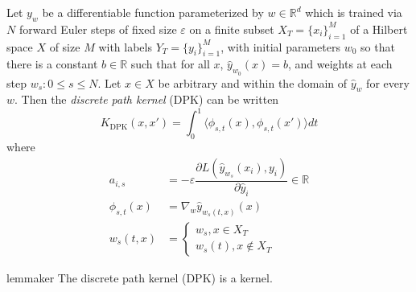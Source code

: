 \begin{definition}
Let $ y_{w}$ be a differentiable function parameterized by $w \in \mathbb{R}^d$ which is trained via $N$ forward Euler steps of fixed size $\varepsilon$ on a finite subset $X_T = \{x_i\}_{i=1}^M$ of a Hilbert space $X$ of size $M$ with labels $Y_T = \{y_i\}_{i=1}^M$, with initial parameters $w_0$ so that there is a constant $b \in \mathbb{R}$ such that for all $x$, $ \hat y_{w_0}(x) = b$, and weights at each step ${w_s : 0 \leq s \leq N}$. Let $x \in X$ be arbitrary and within the domain of $\hat y_w$ for every $w$. Then the \emph{discrete path kernel} (DPK) can be written  
\begin{equation}
 K_{\text{DPK}}(x, x') = \int_0^1\langle \phi_{s,t}(x), \phi_{s,t}(x')\rangle dt
\end{equation}
where
\begin{align}
a_{i, s} &= -\varepsilon  \dfrac{\partial L(\hat y_{w_s}(x_i),  y_i)}{\partial \hat y_i} \in \mathbb{R} \\
\phi_{s,t}(x) &=  \nabla_w \hat y_{w_s(t,x)} (x)\\
w_s(t,x) &= \begin{cases} w_s, x \in X_T\\ w_s(t), x \notin X_T \end{cases}
\end{align}
\end{definition}
\begin{restatable}{lemma}{ker}
The discrete path kernel (DPK) is a kernel.
\end{restatable}



